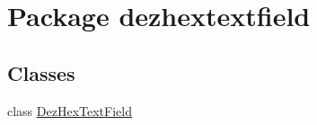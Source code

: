\hypertarget{namespacedezhextextfield}{}\section{Package dezhextextfield}
\label{namespacedezhextextfield}
\subsection*{Classes}
\begin{DoxyCompactItemize}
\item 
class \hyperlink{classdezhextextfield_1_1_dez_hex_text_field}{Dez\+Hex\+Text\+Field}
\end{DoxyCompactItemize}
